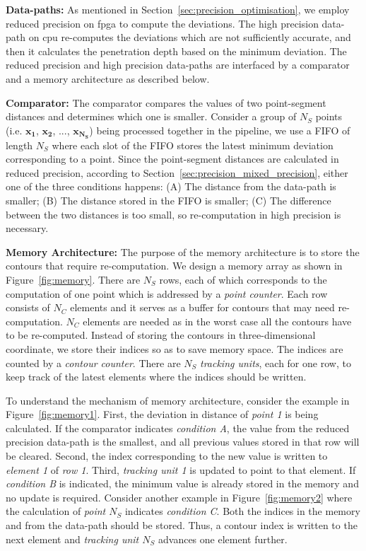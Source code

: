 \noindent \textbf{Data-paths:}
As mentioned in Section~\ref{sec:precision_optimisation}, we employ reduced precision on \gls{fpga} to compute the deviations.
The high precision data-path on \gls{cpu} re-computes the deviations which are not sufficiently accurate,
and then it calculates the penetration depth based on the minimum deviation.
The reduced precision and high precision data-paths are interfaced by a comparator and a memory architecture as described below.

\noindent \textbf{Comparator:}
The comparator compares the values of two point-segment distances and determines which one is smaller.
Consider a group of $N_{S}$ points (i.e. $\boldsymbol{x_1}$, $\boldsymbol{x_2}$, ..., $\boldsymbol{x_{N_S}}$) being processed together in the pipeline, we use a FIFO of length $N_{S}$ where
each slot of the FIFO stores the latest minimum deviation corresponding to a point.
Since the point-segment distances are calculated in reduced precision, according to Section~\ref{sec:precision_mixed_precision}, 
either one of the three conditions happens:
(A) The distance from the data-path is smaller; 
(B) The distance stored in the FIFO is smaller; 
(C) The difference between the two distances is too small, so re-computation in high precision is necessary.

\noindent \textbf{Memory Architecture:}
The purpose of the memory architecture is to store the contours that require re-computation.
We design a memory array as shown in Figure~\ref{fig:memory}.
There are $N_S$ rows, each of which corresponds to the computation of one point which is addressed by a \textit{point counter}.
Each row consists of $N_C$ elements and it serves as a buffer for contours that may need re-computation.
$N_C$ elements are needed as in the worst case all the contours have to be re-computed.
Instead of storing the contours in three-dimensional coordinate, we store their indices so as to save memory space.
The indices are counted by a \textit{contour counter}.
There are $N_S$ \textit{tracking units}, each for one row, to keep track of the latest elements where the indices should be written.

To understand the mechanism of memory architecture, consider the example in Figure~\ref{fig:memory1}.
First, the deviation in distance of \textit{point 1} is being calculated.
If the comparator indicates \emph{condition A}, the value from the reduced precision data-path is the smallest, and all previous values stored in that row will be cleared.
Second, the index corresponding to the new value is written to \textit{element 1} of \textit{row 1}.
Third, \textit{tracking unit 1} is updated to point to that element.
If \emph{condition B} is indicated, the minimum value is already stored in the memory and no update is required.
Consider another example in Figure~\ref{fig:memory2} where the calculation of \textit{point $N_S$} indicates \emph{condition C}. 
Both the indices in the memory and from the data-path should be stored.
Thus, a contour index is written to the next element and \textit{tracking unit $N_S$} advances one element further.

